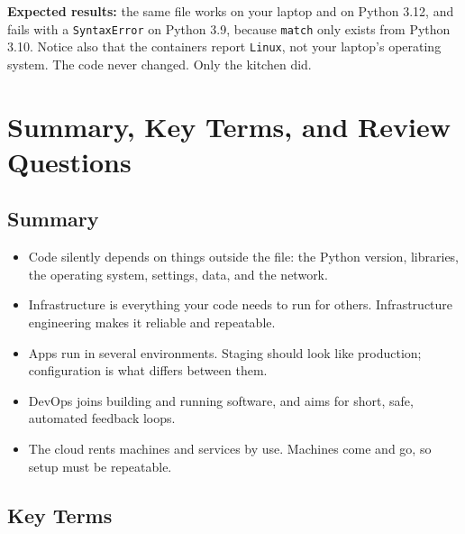 \textbf{Expected results:} the same file works on your laptop and on Python 3.12, and fails with a \texttt{SyntaxError} on Python 3.9, because \texttt{match} only exists from Python 3.10. Notice also that the containers report \texttt{Linux}, not your laptop's operating system. The code never changed. Only the kitchen did.

\section{Summary, Key Terms, and Review Questions}\label{01-from-works-on-my-machine-to-works-for-everyone:summary-key-terms-and-review-questions}

\subsection*{Summary}\label{01-from-works-on-my-machine-to-works-for-everyone:summary}

\begin{itemize}
\tightlist
\item
  Code silently depends on things outside the file: the Python version, libraries, the operating system, settings, data, and the network.
\item
  Infrastructure is everything your code needs to run for others. Infrastructure engineering makes it reliable and repeatable.
\item
  Apps run in several environments. Staging should look like production; configuration is what differs between them.
\item
  DevOps joins building and running software, and aims for short, safe, automated feedback loops.
\item
  The cloud rents machines and services by use. Machines come and go, so setup must be repeatable.
\end{itemize}


\subsection*{Key Terms}\label{01-from-works-on-my-machine-to-works-for-everyone:key-terms}

